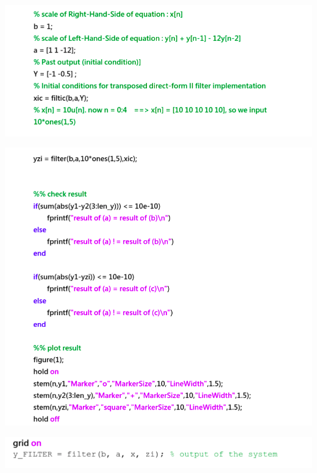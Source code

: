 \documentclass[a4paper]{article}
\begin{document}
	\begin{center}
		\includegraphics[width=1\linewidth]{screenshot025}
	\end{center}
	
	\begin{center}
		\includegraphics[width=1\linewidth]{screenshot026}
	\end{center}
	
	
	
	\begin{center}
		\includegraphics[width=1\linewidth]{screenshot027}
	\end{center}
	
	
	
\end{document}
